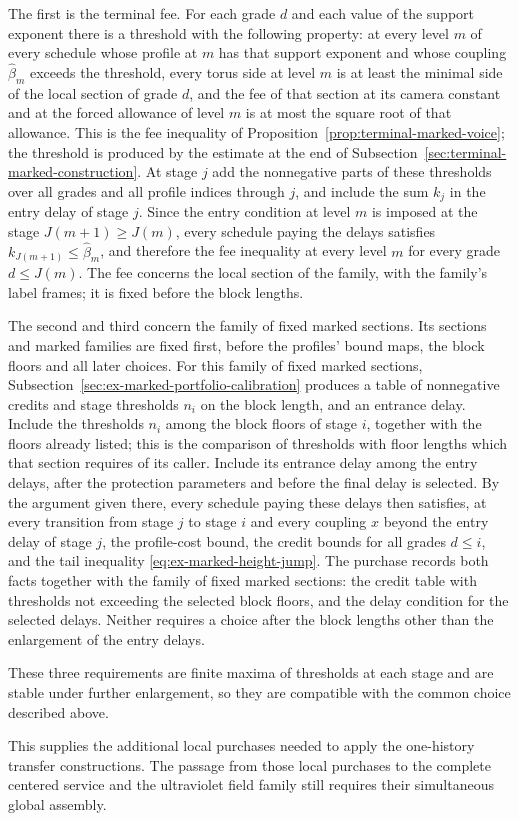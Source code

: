 The first is the terminal fee. For each grade $d$ and each value of the
support exponent there is a threshold with the following property: at
every level $m$ of every schedule whose profile at $m$ has that support
exponent and whose coupling $\widehat\beta_m$ exceeds the threshold,
every torus side at level $m$ is at least the minimal side of the local
section of grade $d$, and the fee of that section at its camera constant
and at the forced allowance of level $m$ is at most the square root of
that allowance. This is the fee inequality of
Proposition~\ref{prop:terminal-marked-voice}; the threshold is produced
by the estimate at the end of
Subsection~\ref{sec:terminal-marked-construction}. At stage $j$ add the
nonnegative parts of these thresholds over all grades and all profile
indices through $j$, and include the sum $k_j$ in the entry delay of
stage $j$. Since the entry condition at level $m$ is imposed at the stage
$J(m+1)\ge J(m)$, every schedule paying the delays satisfies
$k_{J(m+1)}\le\widehat\beta_m$, and therefore the fee inequality at
every level $m$ for every grade $d\le J(m)$. The fee concerns the local
section of the family, with the family's label frames; it is fixed before
the block lengths.

The second and third concern the family of fixed marked sections. Its sections and
marked families are fixed first, before the profiles' bound maps, the
block floors and all later choices. For this family of fixed marked sections,
Subsection~\ref{sec:ex-marked-portfolio-calibration} produces a table of
nonnegative credits and stage thresholds $n_i$ on the block length, and
an entrance delay. Include the thresholds $n_i$ among the block floors
of stage $i$, together with the floors already listed; this is the
comparison of thresholds with floor lengths which that section requires
of its caller. Include its entrance delay among the entry delays, after
the protection parameters and before the final delay is selected. By the
argument given there, every schedule paying these delays then satisfies,
at every transition from stage $j$ to stage $i$ and every coupling $x$
beyond the entry delay of stage $j$, the profile-cost bound, the credit
bounds for all grades $d\le i$, and the tail inequality
\eqref{eq:ex-marked-height-jump}. The purchase records both facts
together with the family of fixed marked sections: the credit table with thresholds not
exceeding the selected block floors, and the delay condition for the
selected delays. Neither requires a choice after the block lengths other
than the enlargement of the entry delays.

These three requirements are finite maxima of thresholds at each stage
and are stable under further enlargement, so they are compatible with
the common choice described above.

This supplies the additional local purchases needed to apply the
one-history transfer constructions. The passage from those local
purchases to the complete centered service and the ultraviolet
field family still requires their simultaneous global assembly.
